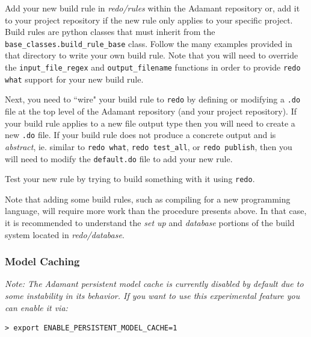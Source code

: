 \vspace{5mm} %
\begin{spacedenumerate}
  \item Add your new build rule in \textit{redo/rules} within the Adamant repository or, add it to your project repository if the new rule only applies to your specific project. Build rules are python classes that must inherit from the \texttt{base\_classes.build\_rule\_base} class. Follow the many examples provided in that directory to write your own build rule. Note that you will need to override the \texttt{input\_file\_regex} and \texttt{output\_filename} functions in order to provide \texttt{redo what} support for your new build rule.
  \item Next, you need to ``wire" your build rule to \texttt{redo} by defining or modifying a \texttt{.do} file at the top level of the Adamant repository (and your project repository). If your build rule applies to a new file output type then you will need to create a new \texttt{.do} file. If your build rule does not produce a concrete output and is \textit{abstract}, ie. similar to \texttt{redo what}, \texttt{redo test\_all}, or \texttt{redo publish}, then you will need to modify the \texttt{default.do} file to add your new rule. 
  \item Test your new rule by trying to build something with it using \texttt{redo}.
\end{spacedenumerate}
\vspace{5mm} %

Note that adding some build rules, such as compiling for a new programming language, will require more work than the procedure presents above. In that case, it is recommended to understand the \textit{set up} and \textit{database} portions of the build system located in \textit{redo/database}.

\subsubsection{Model Caching} \label{The Model Cache}

\textit{Note: The Adamant persistent model cache is currently disabled by default due to some instability in its behavior. If you want to use this experimental feature you can enable it via:}

\vspace{5mm} %
\begin{verbatim}
> export ENABLE_PERSISTENT_MODEL_CACHE=1
\end{verbatim}
\vspace{5mm} %


